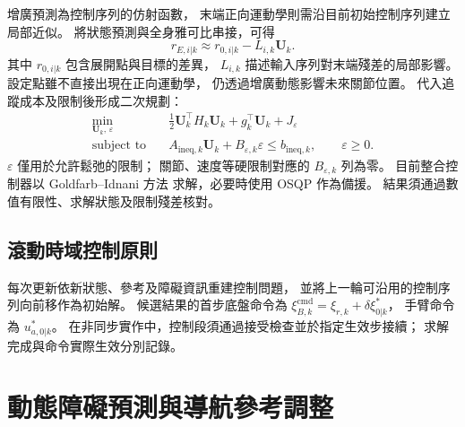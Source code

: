 增廣預測為控制序列的仿射函數，
末端正向運動學則需沿目前初始控制序列建立局部近似。
將狀態預測與全身雅可比串接，可得
\begin{equation}
    r_{E,i|k}\approx r_{0,i|k}-L_{i,k}\mathbf U_k .
    \label{eq:ch3_tcp_affine_residual}
\end{equation}
其中 $r_{0,i|k}$ 包含展開點與目標的差異，
$L_{i,k}$ 描述輸入序列對末端殘差的局部影響。
設定點雖不直接出現在正向運動學，
仍透過增廣動態影響未來關節位置。
代入追蹤成本及限制後形成二次規劃：
\begin{equation}
    \begin{aligned}
        \min_{\mathbf U_k,\,\varepsilon}\quad&
        \frac12\mathbf U_k^\top H_k\mathbf U_k
        +g_k^\top\mathbf U_k+J_\varepsilon\\
        \text{subject to}\quad&
        A_{\mathrm{ineq},k}\mathbf U_k
        +B_{\varepsilon,k}\varepsilon\leq b_{\mathrm{ineq},k},
        \qquad\varepsilon\geq0 .
    \end{aligned}
    \label{eq:ch3_wholebody_qp}
\end{equation}
$\varepsilon$ 僅用於允許鬆弛的限制；
關節、速度等硬限制對應的 $B_{\varepsilon,k}$ 列為零。
目前整合控制器以 Goldfarb--Idnani 方法
\cite{goldfarb1983dual}求解，必要時使用 OSQP
\cite{stellato2020osqp}作為備援。
結果須通過數值有限性、求解狀態及限制殘差核對。

\subsection{滾動時域控制原則}
\label{subsec:wholebody_receding_horizon}

每次更新依新狀態、參考及障礙資訊重建控制問題，
並將上一輪可沿用的控制序列向前移作為初始解。
候選結果的首步底盤命令為
$\xi_{B,k}^{\mathrm{cmd}}=\xi_{r,k}+\delta\xi_{0|k}^{*}$，
手臂命令為 $u_{a,0|k}^{*}$。
在非同步實作中，控制段須通過接受檢查並於指定生效步接續；
求解完成與命令實際生效分別記錄。

\section{動態障礙預測與導航參考調整}
\label{sec:dynamic_obstacle_avoidance}

